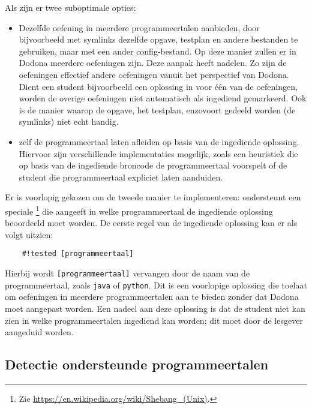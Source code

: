 Als  zijn er twee suboptimale opties:
\begin{itemize}
    \item Dezelfde oefening in meerdere programmeertalen aanbieden, door bijvoorbeeld met symlinks dezelfde opgave, testplan en andere bestanden te gebruiken, maar met een ander config-bestand.
    Op deze manier zullen er in Dodona meerdere oefeningen zijn.
    Deze aanpak heeft nadelen.
    Zo zijn de oefeningen effectief andere oefeningen vanuit het perspectief van Dodona.
    Dient een student bijvoorbeeld een oplossing in voor één van de oefeningen, worden de overige oefeningen niet automatisch als ingediend gemarkeerd.
    Ook is de manier waarop de opgave, het testplan, enzovoort gedeeld worden (de symlinks) niet echt handig.
    \item \tested{} zelf de programmeertaal laten afleiden op basis van de ingediende oplossing.
    Hiervoor zijn verschillende implementaties mogelijk, zoals een heuristiek die op basis van de ingediende broncode de programmeertaal voorspelt of de student die programmeertaal expliciet laten aanduiden.
\end{itemize}

Er is voorlopig gekozen om de tweede manier te implementeren: \tested{} ondersteunt een speciale \footnote{Zie \url{https://en.wikipedia.org/wiki/Shebang_(Unix)}.} die aangeeft in welke programmeertaal de ingediende oplossing beoordeeld moet worden.
De eerste regel van de ingediende oplossing kan er als volgt uitzien:

\begin{verbatim}
    #!tested [programmeertaal]
\end{verbatim}

Hierbij wordt \texttt{[programmeertaal]} vervangen door de naam van de programmeertaal, zoals \texttt{java} of \texttt{python}.
Dit is een voorlopige oplossing die toelaat om oefeningen in meerdere programmeertalen aan te bieden zonder dat Dodona moet aangepast worden.
Een nadeel aan deze oplossing is dat de student niet kan zien in welke programmeertalen ingediend kan worden;
dit moet door de lesgever aangeduid worden.

\subsection{Detectie ondersteunde programmeertalen}\label{subsec:detectie-beschikbare-programmeertalen}

